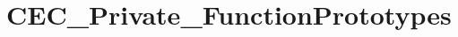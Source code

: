 \hypertarget{group___c_e_c___private___function_prototypes}{}\section{C\+E\+C\+\_\+\+Private\+\_\+\+Function\+Prototypes}
\label{group___c_e_c___private___function_prototypes}
